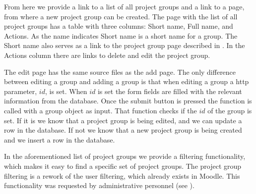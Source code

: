 From here we provide a link to a list of all project groups and a link to a page, from where a new project group can be created.
The page with the list of all project groups has a table with three columns: Short name, Full name, and Actions.
As the name indicates Short name is a short name for a group. 
The Short name also serves as a link to the project group page described in .
In the Actions column there are links to delete and edit the project group.

The edit page has the same source files as the add page.
The only difference between editing a group and adding a group is that when editing a group a http parameter, $id$, is set.
When $id$ is set the form fields are filled with the relevant information from the database.
Once the submit button is pressed the function  is called with a group object as input.
That function checks if the $id$ of the group is set. 
If it is we know that a project group is being edited, and we can update a row in the database.
If not we know that a new project group is being created and we insert a row in the database.

In the aforementioned list of project groups we provide a filtering functionality, which makes it easy to find a specific set of project groups.
The project group filtering is a rework of the user filtering, which already exists in Moodle.
This functionality was requested by administrative personnel (see ).

